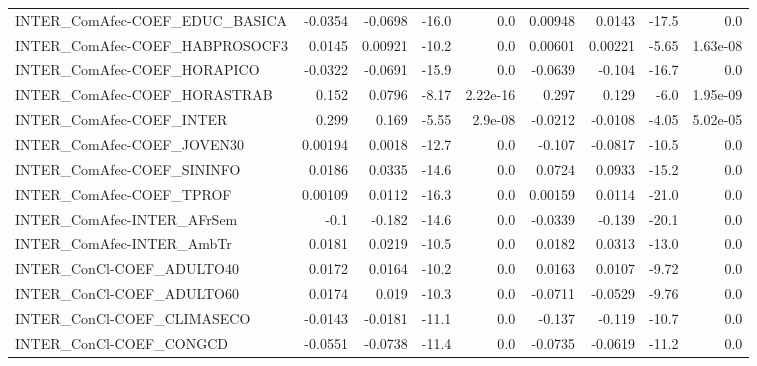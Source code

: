 \begin{tabular}{lrrrrrrrr}
INTER\_ComAfec-COEF\_EDUC\_BASICA         &     -0.0354 &      -0.0698 &    -16.0 &      0.0 &    0.00948 &      0.0143 &        -17.5 &           0.0 \\
INTER\_ComAfec-COEF\_HABPROSOCF3         &      0.0145 &      0.00921 &    -10.2 &      0.0 &    0.00601 &     0.00221 &        -5.65 &      1.63e-08 \\
INTER\_ComAfec-COEF\_HORAPICO            &     -0.0322 &      -0.0691 &    -15.9 &      0.0 &    -0.0639 &      -0.104 &        -16.7 &           0.0 \\
INTER\_ComAfec-COEF\_HORASTRAB           &       0.152 &       0.0796 &    -8.17 & 2.22e-16 &      0.297 &       0.129 &         -6.0 &      1.95e-09 \\
INTER\_ComAfec-COEF\_INTER               &       0.299 &        0.169 &    -5.55 &  2.9e-08 &    -0.0212 &     -0.0108 &        -4.05 &      5.02e-05 \\
INTER\_ComAfec-COEF\_JOVEN30             &     0.00194 &       0.0018 &    -12.7 &      0.0 &     -0.107 &     -0.0817 &        -10.5 &           0.0 \\
INTER\_ComAfec-COEF\_SININFO             &      0.0186 &       0.0335 &    -14.6 &      0.0 &     0.0724 &      0.0933 &        -15.2 &           0.0 \\
INTER\_ComAfec-COEF\_TPROF               &     0.00109 &       0.0112 &    -16.3 &      0.0 &    0.00159 &      0.0114 &        -21.0 &           0.0 \\
INTER\_ComAfec-INTER\_AFrSem             &        -0.1 &       -0.182 &    -14.6 &      0.0 &    -0.0339 &      -0.139 &        -20.1 &           0.0 \\
INTER\_ComAfec-INTER\_AmbTr              &      0.0181 &       0.0219 &    -10.5 &      0.0 &     0.0182 &      0.0313 &        -13.0 &           0.0 \\
INTER\_ConCl-COEF\_ADULTO40              &      0.0172 &       0.0164 &    -10.2 &      0.0 &     0.0163 &      0.0107 &        -9.72 &           0.0 \\
INTER\_ConCl-COEF\_ADULTO60              &      0.0174 &        0.019 &    -10.3 &      0.0 &    -0.0711 &     -0.0529 &        -9.76 &           0.0 \\
INTER\_ConCl-COEF\_CLIMASECO             &     -0.0143 &      -0.0181 &    -11.1 &      0.0 &     -0.137 &      -0.119 &        -10.7 &           0.0 \\
INTER\_ConCl-COEF\_CONGCD                &     -0.0551 &      -0.0738 &    -11.4 &      0.0 &    -0.0735 &     -0.0619 &        -11.2 &           0.0 \\

\end{tabular}
